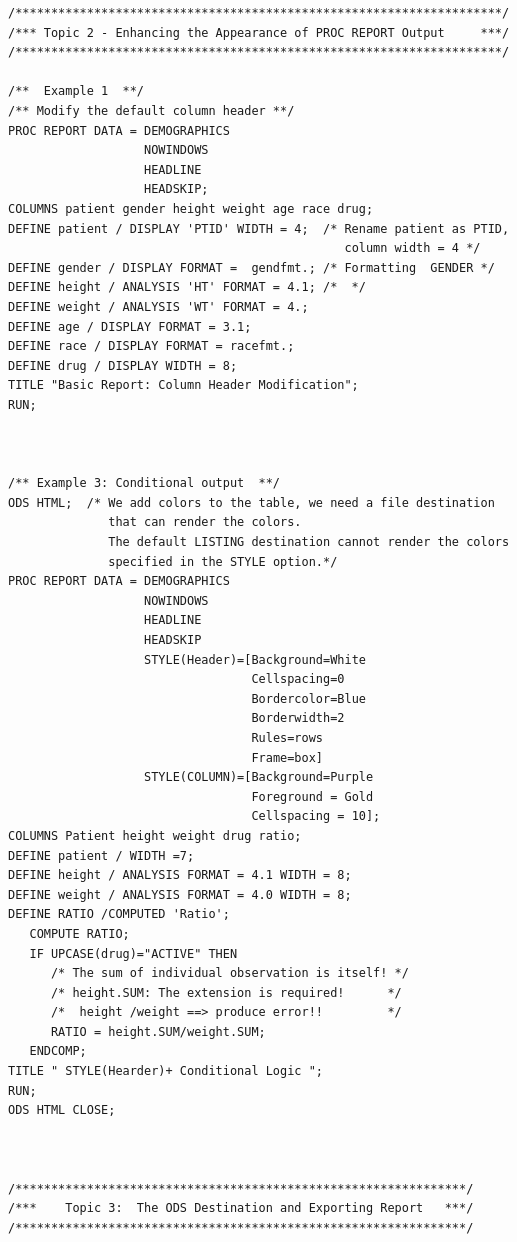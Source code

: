 \documentclass[
]{book}
\begin{document}
\begin{verbatim}
/********************************************************************/
/*** Topic 2 - Enhancing the Appearance of PROC REPORT Output     ***/
/********************************************************************/

/**  Example 1  **/ 
/** Modify the default column header **/
PROC REPORT DATA = DEMOGRAPHICS
                   NOWINDOWS
                   HEADLINE
                   HEADSKIP;
COLUMNS patient gender height weight age race drug;
DEFINE patient / DISPLAY 'PTID' WIDTH = 4;  /* Rename patient as PTID, 
                                               column width = 4 */
DEFINE gender / DISPLAY FORMAT =  gendfmt.; /* Formatting  GENDER */
DEFINE height / ANALYSIS 'HT' FORMAT = 4.1; /*  */
DEFINE weight / ANALYSIS 'WT' FORMAT = 4.;
DEFINE age / DISPLAY FORMAT = 3.1;
DEFINE race / DISPLAY FORMAT = racefmt.;
DEFINE drug / DISPLAY WIDTH = 8;
TITLE "Basic Report: Column Header Modification";
RUN;



/** Example 3: Conditional output  **/
ODS HTML;  /* We add colors to the table, we need a file destination 
              that can render the colors.
              The default LISTING destination cannot render the colors 
              specified in the STYLE option.*/
PROC REPORT DATA = DEMOGRAPHICS
                   NOWINDOWS
                   HEADLINE
                   HEADSKIP
                   STYLE(Header)=[Background=White 
                                  Cellspacing=0
                                  Bordercolor=Blue 
                                  Borderwidth=2
                                  Rules=rows 
                                  Frame=box]  
                   STYLE(COLUMN)=[Background=Purple 
                                  Foreground = Gold 
                                  Cellspacing = 10];
COLUMNS Patient height weight drug ratio;
DEFINE patient / WIDTH =7;
DEFINE height / ANALYSIS FORMAT = 4.1 WIDTH = 8;  
DEFINE weight / ANALYSIS FORMAT = 4.0 WIDTH = 8;
DEFINE RATIO /COMPUTED 'Ratio';
   COMPUTE RATIO;
   IF UPCASE(drug)="ACTIVE" THEN
      /* The sum of individual observation is itself! */
      /* height.SUM: The extension is required!      */
      /*  height /weight ==> produce error!!         */
      RATIO = height.SUM/weight.SUM; 
   ENDCOMP;
TITLE " STYLE(Hearder)+ Conditional Logic ";
RUN;
ODS HTML CLOSE;



/***************************************************************/
/***    Topic 3:  The ODS Destination and Exporting Report   ***/
/***************************************************************/


\end{verbatim}
\end{document}
